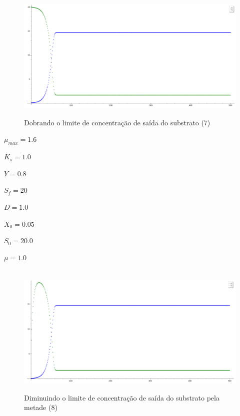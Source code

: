 \documentclass{article}
\begin{document}
\begin{figure}[H]
        \centering
        \hbox{\hspace{1.0em} \includegraphics[scale=0.5]{Modelo_7.png}} 
        \caption*{Dobrando o limite de concentração de saída do substrato (7)}
\end{figure}
\vspace{-7mm}
\begin{itemize}
\begin{multicols}{4}
    \item $\mu_{max} = 1.6$ 
    \item $K_s = 1.0$ 
\columnbreak    
    \item $Y = 0.8$ 
    \item $S_f = 20$ 
\columnbreak    
    \item $D = 1.0$ 
    \item $X_0 = 0.05$ 
\columnbreak    
    \item $S_0 = 20.0$ 
    \item $\mu = 1.0$
\end{multicols}
\end{itemize} 
\begin{figure}[H]
        \centering
        \hbox{\hspace{1.0em} \includegraphics[scale=0.5]{Modelo_8.png}} 
        \caption*{Diminuindo o limite de concentração de saída do substrato pela metade (8)}
\end{figure}
\end{document}
